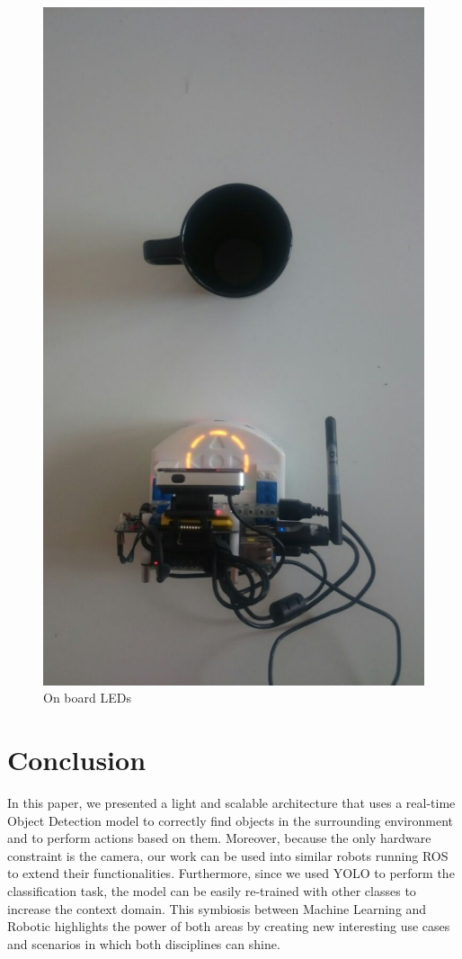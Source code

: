 \documentclass[letterpaper, 10 pt, conference]{ieeeconf}  %
\begin{document}
\begin{figure}[H]
\begin{center}
\includegraphics[width=0.25\linewidth]{images/leds/5}
\end{center}
\caption{On board LEDs}
\end{figure}
\section{Conclusion}
In this paper, we presented a light and scalable architecture that uses a real-time Object Detection model to correctly find objects in the surrounding environment and to perform actions based on them. Moreover, because the only  hardware constraint is the camera, our work can be used into similar robots running ROS  to extend their functionalities. Furthermore, since we used YOLO to perform the classification task, the model can be easily re-trained with other classes to increase the context domain. This symbiosis between Machine Learning and Robotic highlights the power of both areas by creating new interesting use cases and scenarios in which both disciplines can shine.

\printbibliography

%
\end{document}
